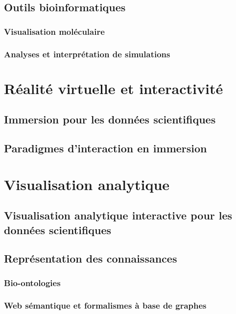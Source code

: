 \subsection{Outils bioinformatiques}

\subsubsection{Visualisation moléculaire}

\subsubsection{Analyses et interprétation de simulations}

\section{Réalité virtuelle et interactivité}

\subsection{Immersion pour les données scientifiques}

\subsection{Paradigmes d'interaction en immersion}

\section{Visualisation analytique}

\subsection{Visualisation analytique interactive pour les données scientifiques}

\subsection{Représentation des connaissances}

\subsubsection{Bio-ontologies}

\cite{schulze-kremer_ontologies_2002}

\subsubsection{Web sémantique et formalismes à base de graphes}

